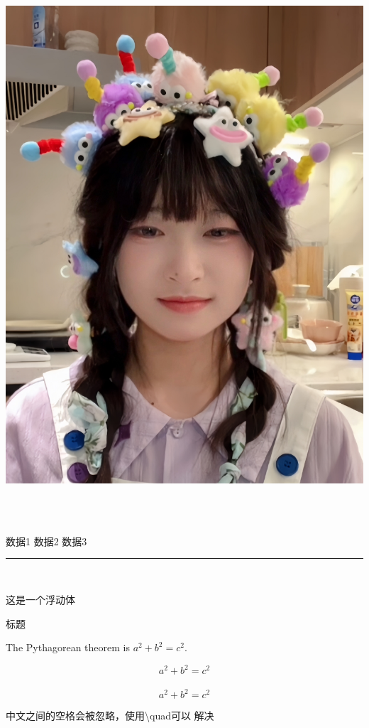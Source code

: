 \documentclass{ctexart}
\begin{document}
\includegraphics[scale = 0.1]{test.jpg}
\par
{} \\
 \\
\raggedright
\begin{minipage}{3em}
    数据1 数据2 数据3
\end{minipage}
\par
\rule{5pt}{8pt}\\

\begin{table}[h]

  这是一个浮动体\caption{标题}

\end{table}

\par 
The Pythagorean theorem is
$a^2 + b^2 = c^2$.

\begin{equation}
    a^2 + b^2 = c^2
\end{equation} \\
\[ a^2 + b^2 = c^2 \] \par
中文之间的空格会被忽略，使用\textbackslash quad可以 \quad 解决 \\
\end{document}
